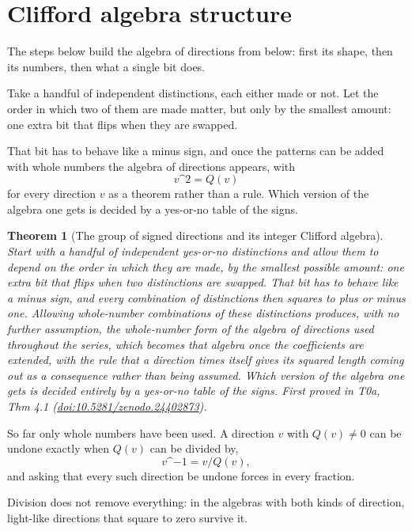 \documentclass[11pt]{article}
\newtheorem{theorem}{Theorem}[section]
\theoremstyle{definition}
\theoremstyle{plain}
\begin{document}
\section{Clifford algebra structure}

The steps below build the algebra of directions from below: first its shape, then its numbers, then what a single bit does.

Take a handful of independent distinctions, each either made or not. Let the order in which two of them are made matter, but only by the smallest amount: one extra bit that flips when they are swapped.

That bit has to behave like a minus sign, and once the patterns can be added with whole numbers the algebra of directions appears, with \[ v\^{}{2} = Q(v) \] for every direction $v$ as a theorem rather than a rule. Which version of the algebra one gets is decided by a yes-or-no table of the signs.

\begin{theorem}[The group of signed directions and its integer Clifford algebra]\label{c:synthesis.signed-directions-and-the-integer-clifford-algebra}
Start with a handful of independent yes-or-no distinctions and allow them to depend on the order in which they are made, by the smallest possible amount: one extra bit that flips when two distinctions are swapped. That bit has to behave like a minus sign, and every combination of distinctions then squares to plus or minus one. Allowing whole-number combinations of these distinctions produces, with no further assumption, the whole-number form of the algebra of directions used throughout the series, which becomes that algebra once the coefficients are extended, with the rule that a direction times itself gives its squared length coming out as a consequence rather than being assumed. Which version of the algebra one gets is decided entirely by a yes-or-no table of the signs.
\emph{First proved in} T0a, Thm 4.1 (\href{https://doi.org/10.5281/zenodo.24402873}{doi:10.5281/zenodo.24402873}).
\end{theorem}

So far only whole numbers have been used. A direction $v$ with $Q(v) \neq 0$ can be undone exactly when $Q(v)$ can be divided by, \[ v\^{}{-1} = v / Q(v), \] and asking that every such direction be undone forces in every fraction.

Division does not remove everything: in the algebras with both kinds of direction, light-like directions that square to zero survive it.
\end{document}
